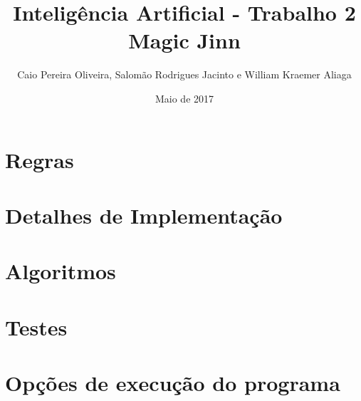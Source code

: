 \documentclass{article}
\title{Inteligência Artificial - Trabalho 2\\Magic Jinn}
\author{Caio Pereira Oliveira, Salomão Rodrigues Jacinto e William Kraemer Aliaga}
\date{Maio de 2017}
\begin{document}
\maketitle

\section{Regras}

\section{Detalhes de Implementação}

\section{Algoritmos}

\section{Testes}

\section{Opções de execução do programa}
\end{document}
